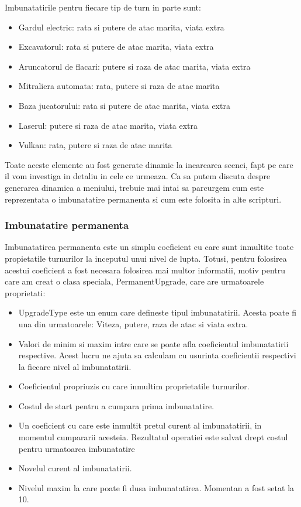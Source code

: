 \documentclass[12pt, a4paper]{article}
\begin{document}
	Imbunatatirile pentru fiecare tip de turn in parte sunt:
	
	\begin{itemize}
		\item Gardul electric: rata si putere de atac marita, viata extra
		\item Excavatorul: rata si putere de atac marita, viata extra
		\item Aruncatorul de flacari: putere si raza de atac marita, viata extra
		\item Mitraliera automata: rata, putere si raza de atac marita
		\item Baza jucatorului: rata si putere de atac marita, viata extra
		\item Laserul: putere si raza de atac marita, viata extra
		\item Vulkan: rata, putere si raza de atac marita
	\end{itemize}
	
	Toate aceste elemente au fost generate dinamic la incarcarea scenei, fapt pe care il vom investiga in detaliu in cele ce urmeaza. Ca sa putem discuta despre generarea dinamica a meniului, trebuie mai intai sa parcurgem cum este reprezentata o imbunatatire permanenta si cum este folosita in alte scripturi.
	
	
	
	
	
	\subsubsection{Imbunatatire permanenta}
	
	Imbunatatirea permanenta este un simplu coeficient cu care sunt inmultite toate propietatile turnurilor la inceputul unui nivel de lupta. Totusi, pentru folosirea acestui coeficient a fost necesara folosirea mai multor informatii, motiv pentru care am creat o clasa speciala, PermanentUpgrade, care are urmatoarele proprietati:
	
	\begin{itemize}
		\item UpgradeType este un enum care defineste tipul imbunatatirii. Acesta poate fi una din urmatoarele: Viteza, putere, raza de atac si viata extra.
		\item Valori de minim si maxim intre care se poate afla coeficientul imbunatatirii respective. Acest lucru ne ajuta sa calculam cu usurinta coeficientii respectivi la fiecare nivel al imbunatatirii.
		\item Coeficientul propriuzis cu care inmultim proprietatile turnurilor.
		\item Costul de start pentru a cumpara prima imbunatatire.
		\item Un coeficient cu care este inmultit pretul curent al imbunatatirii, in momentul cumpararii acesteia. Rezultatul operatiei este salvat drept costul pentru urmatoarea imbunatatire
		\item Novelul curent al imbunatatirii.
		\item Nivelul maxim la care poate fi dusa imbunatatirea. Momentan a fost setat la 10.
	\end{itemize}
	
\end{document}
